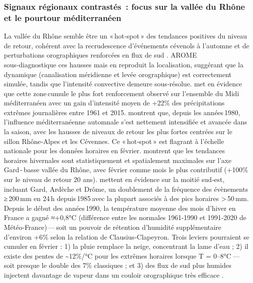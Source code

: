 \documentclass[
  article,
  nofooter,
  noheadings]{jss}
\begin{document}
\subsubsection{Signaux régionaux contrastés~: focus sur la vallée du
Rhône et le pourtour
méditerranéen}\label{signaux-ruxe9gionaux-contrastuxe9s-focus-sur-la-valluxe9e-du-rhuxf4ne-et-le-pourtour-muxe9diterranuxe9en}

La vallée du Rhône semble être un «\,hot‑spot\,» des tendances positives
du niveau de retour, cohérent avec la recrudescence d'événements
cévenols à l'automne et de perturbations orographiques renforcées en
flux de sud \citep{Fresnay2012}. AROME sous‑diagnostique ces hausses
mais en reproduit la localisation, suggérant que la dynamique
(canalisation méridienne et levée orographique) est correctement
simulée, tandis que l'intensité convective demeure sous‑résolue.
\citet{Ribes2019} met en évidence que cette zone\,cumule le plus fort
renforcement observé sur l'ensemble du Midi méditerranéen avec un gain
d'intensité moyen de +22\% des précipitations extrêmes journalières
entre 1961 et 2015. \citet{blanchet2021explaining} montrent que, depuis
les années\,1980, l'influence méditerranéenne automnale s'est nettement
intensifiée et avancée dans la saison, avec les hausses de niveaux de
retour les plus fortes centrées sur le sillon Rhône‑Alpes et les
Cévennes. Ce «\,hot‑spot\,» est flagrant à l'échelle nationale pour les
données horaires en février. \citet{Berghald2025} montrent que les
tendances horaires hivernales sont statistiquement et spatialement
maximales sur l'axe Gard\,-\,basse vallée du Rhône, avec février comme
mois le plus contributif (+100\% sur le niveau de retour 20 ans).
\citet{Ribes2019} mettent en évidence sur la moitié sud‑est, incluant
Gard, Ardèche et Drôme, un doublement de la fréquence des
évènements\,≥\,200\,mm en 24\,h depuis\,1985\,avec la plupart associés à
des pics horaires \textgreater\,50\,mm. Depuis le début des
années\,1990, la température moyenne des mois d'hiver en France a gagné
≈+0,8°C (différence entre les normales 1961‑1990 et 1991‑2020 de
Météo‑France)\,---\,soit un pouvoir de rétention d'humidité
supplémentaire d'environ +6\% selon la relation de Clausius‑Clapeyron.
Trois leviers pourraient se cumuler en février : 1) la pluie remplace la
neige, concentrant la lame d'eau \citep{ZAQOUT2024131439} ; 2) il existe
des pentes de \textasciitilde12\%/°C pour les extrêmes horaires lorsque
T = 0--8°C --- soit presque le double des 7\% classiques
\citep{Drobinski2016} ; et 3) des flux de sud plus humides injectent
davantage de vapeur dans un couloir orographique très efficace
\citep{LorentePlazas2020}.
\end{document}
